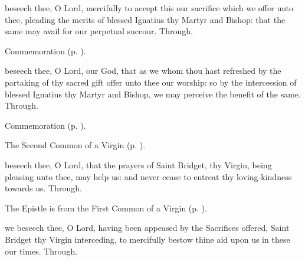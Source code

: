 \secret
{} beseech thee, O Lord, mercifully to accept this our sacrifice which we offer unto thee, pleading the merits of blessed Ignatius thy Martyr and Bishop: that the same may avail for our perpetual succour. Through.

\begin{rubric}
    Commemoration  (p. \pageref{BridgetSecret}).
\end{rubric}


\postcommunion
{} beseech thee, O Lord, our God, that as we whom thou hast refreshed by the partaking of thy sacred gift offer unto thee our worship: so by the intercession of blessed Ignatius thy Martyr and Bishop, we may perceive the benefit of the same. Through.

\begin{rubric}
    Commemoration  (p. \pageref{BridgetPostcommmunion}).
\end{rubric}



\begin{rubric}
	The Second Common of a Virgin (p. \pageref{CommonVirginOnlyII}).
\end{rubric}

\collect\label{BridgetCollect}
 beseech thee, O Lord, that the prayers of Saint Bridget, thy Virgin, being pleasing unto thee, may help us: and never cease to entreat thy loving-kindness towards us. Through.

\begin{rubric}
	The Epistle is from the First Common of a Virgin (p. \pageref{CommonVirginOnlyIEpistle}).
\end{rubric}


\secret\label{BridgetSecret}
 we beseech thee, O Lord, having been appeased by the Sacrifices offered, Saint Bridget thy Virgin interceding, to mercifully bestow thine aid upon us in these our times. Through.


